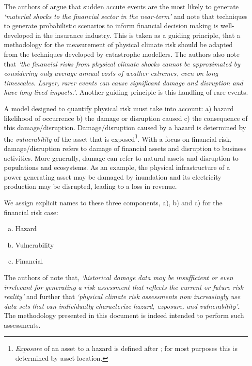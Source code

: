 \documentclass[a4paper,11pt]{extarticle} %
\theoremstyle{definition}
\begin{document}
The authors of \cite{RangerEtAl:2022} argue that sudden accute events are the most likely to generate \emph{`material shocks to the financial sector in the near-term'} and note that techniques to generate probabilistic scenarios to inform financial decision making is well-developed in the insurance industry. This is taken as a guiding principle, that a methodology for the measurement of physical climate risk should be adapted from the techniques developed by catastrophe modellers. The authors also note that \emph{`the financial risks from physical climate shocks cannot be approximated by considering only average annual costs of weather extremes, even on long timescales. Larger, rarer events can cause significant damage and disruption and have long-lived impacts.'}. Another guiding principle is this handling of rare events.

A model designed to quantify physical risk must take into account: a) hazard likelihood of occurrence  b) the damage or disruption caused c) the consequence of this damage/disruption. Damage/disruption caused by a hazard is determined by the \emph{vulnerability} of the asset that is exposed\footnote{\emph{Exposure} of an asset to a hazard is defined after \cite{MaskreyEtAl:2011}; for most purposes this is determined by asset location.}. With a focus on financial risk, damage/disruption refers to damage of financial assets and disruption to business activities. More generally, damage can refer to natural assets and disruption to populations and ecosystems. As an example, the physical infrastructure of a power generating asset may be damaged by inundation and its electricity production may be disrupted, leading to a loss in revenue.

We assign explicit names to these three components, a), b) and c) for the financial risk case:
\begin{enumerate}[a)]
\item Hazard
\item Vulnerability
\item Financial
\end{enumerate}

The authors of \cite{BavandiEtAl:2022} note that, \emph{`historical damage data may be insufficient or even irrelevant for generating a risk assessment that reflects the current or future risk reality'} and further that \emph{`physical climate risk assessments now increasingly use data sets that can individually characterize hazard, exposure, and vulnerability'}. The methodology presented in this document is indeed intended to perform such assessments.
\end{document}
